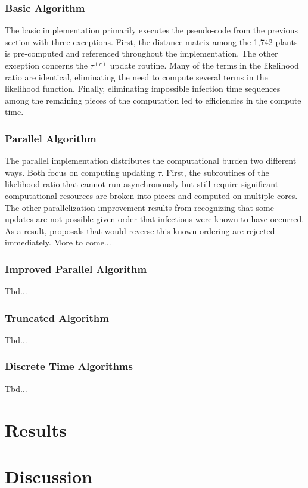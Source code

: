 \documentclass{uwstat572}
\begin{document}
\subsubsection{Basic Algorithm}
The basic implementation primarily executes the pseudo-code from the previous section with three exceptions.
First, the distance matrix among the 1,742 plants is pre-computed and referenced throughout the implementation. 
The other exception concerns the $\tau^{(r)}$ update routine. 
Many of the terms in the likelihood ratio are identical, eliminating the need to compute several terms in the likelihood function. 
Finally, eliminating impossible infection time sequences among the remaining pieces of the computation led to efficiencies in the compute time.

\subsubsection{Parallel Algorithm}
The parallel implementation distributes the computational burden two different ways. 
Both focus on computing updating $\tau$. 
First, the subroutines of the likelihood ratio that cannot run asynchronously but still require significant computational resources are broken into pieces and computed on multiple cores. 
The other parallelization improvement results from recognizing that some updates are not possible given order that infections were known to have occurred. 
As a result, proposals that would reverse this known ordering are rejected immediately. 
More to come... 

\subsubsection{Improved Parallel Algorithm}
Tbd...

\subsubsection{Truncated Algorithm}
Tbd...

\subsubsection{Discrete Time Algorithms}
Tbd...

\section{Results}

\section{Discussion}


\end{document}
